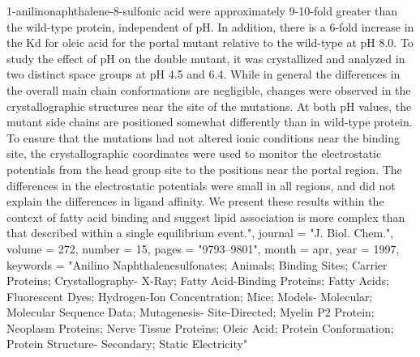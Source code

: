{              1-anilinonaphthalene-8-sulfonic acid were approximately 9-10-fold
              greater than the wild-type protein, independent of pH. In
              addition, there is a 6-fold increase in the Kd for oleic acid for
              the portal mutant relative to the wild-type at pH 8.0. To study
              the effect of pH on the double mutant, it was crystallized and
              analyzed in two distinct space groups at pH 4.5 and 6.4. While in
              general the differences in the overall main chain conformations
              are negligible, changes were observed in the crystallographic
              structures near the site of the mutations. At both pH values, the
              mutant side chains are positioned somewhat differently than in
              wild-type protein. To ensure that the mutations had not altered
              ionic conditions near the binding site, the crystallographic
              coordinates were used to monitor the electrostatic potentials
              from the head group site to the positions near the portal region.
              The differences in the electrostatic potentials were small in all
              regions, and did not explain the differences in ligand affinity.
              We present these results within the context of fatty acid binding
              and suggest lipid association is more complex than that described
              within a single equilibrium event.",
  journal  = "J. Biol. Chem.",
  volume   =  272,
  number   =  15,
  pages    = "9793--9801",
  month    =  apr,
  year     =  1997,
  keywords = "Anilino Naphthalenesulfonates; Animals; Binding Sites; Carrier
              Proteins; Crystallography- X-Ray; Fatty Acid-Binding Proteins;
              Fatty Acids; Fluorescent Dyes; Hydrogen-Ion Concentration; Mice;
              Models- Molecular; Molecular Sequence Data; Mutagenesis-
              Site-Directed; Myelin P2 Protein; Neoplasm Proteins; Nerve Tissue
              Proteins; Oleic Acid; Protein Conformation; Protein Structure-
              Secondary; Static Electricity"
}

